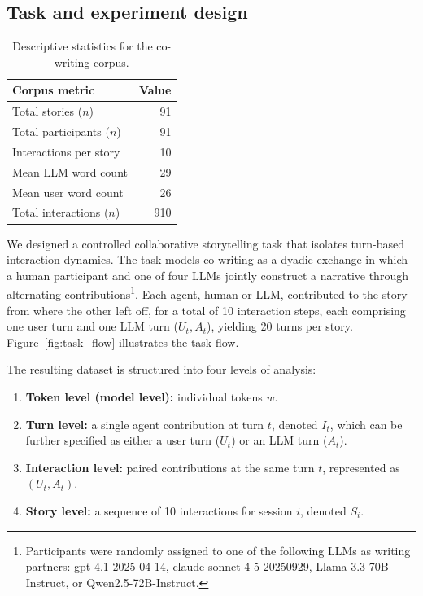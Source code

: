 \documentclass[11pt]{article}
\begin{document}
\subsection{Task and experiment design}
\begin{table}[t]
\centering
\small
\setlength{\tabcolsep}{6pt}
\renewcommand{\arraystretch}{1.2}
\begin{tabular}{l r}
\toprule
\textbf{Corpus metric} & \textbf{Value} \\
\midrule
Total stories ($n$) & 91\\
Total participants ($n$) & 91\\
Interactions per story& 10 \\
Mean LLM word count& 29\\
 Mean user word count&26\\
Total interactions ($n$) & 910\\
\bottomrule
\end{tabular}
\caption{Descriptive statistics for the co-writing corpus.}
\label{tab:corpus_descriptives}
\end{table}

We designed a controlled collaborative storytelling task that isolates turn-based interaction dynamics. The task models co-writing as a dyadic exchange in which a human participant and one of four LLMs jointly construct a narrative through alternating contributions\footnote{Participants were randomly assigned to one of the following LLMs as writing partners: gpt-4.1-2025-04-14, claude-sonnet-4-5-20250929, Llama-3.3-70B-Instruct, or Qwen2.5-72B-Instruct.}.
Each agent, human or LLM, contributed to the story from where the other left off, for a total of 10 interaction steps, each comprising one user turn and one LLM turn ($U_t, A_t$), yielding 20 turns per story.
Figure~\ref{fig:task_flow} illustrates the task flow. 

The resulting dataset is structured into four levels of analysis:

\begin{enumerate}
    \item \textbf{Token level (model level):} individual tokens $w$.
    \item \textbf{Turn level:} a single agent contribution at turn $t$, denoted $I_t$, which can be further specified as either a user turn ($U_t$) or an LLM turn ($A_t$).
    \item \textbf{Interaction level:} paired contributions at the same turn $t$, represented as $(U_t, A_t)$.
    \item \textbf{Story level:} a sequence of 10 interactions for session $i$, denoted $S_i$.
\end{enumerate}
\end{document}
